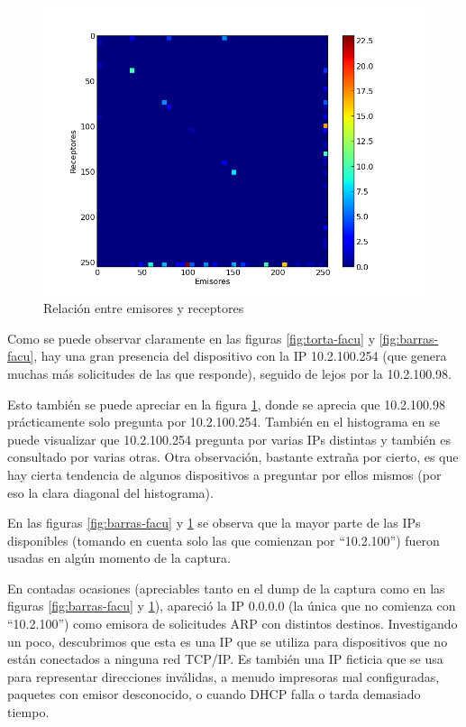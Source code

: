 \begin{figure}[!h]
  \includegraphics[width=\textwidth,keepaspectratio]{graph/hist2d-facu.png}
  \caption{Relación entre emisores y receptores}
  \label{fig:hist2d-facu}
\end{figure}

Como se puede observar claramente en las figuras \ref{fig:torta-facu} y 
\ref{fig:barras-facu}, hay una gran presencia del dispositivo con la IP
10.2.100.254 (que genera muchas más solicitudes de las que responde),
seguido de lejos por la 10.2.100.98.

Esto también se puede apreciar en la figura \ref{fig:hist2d-facu}, donde se
aprecia que 10.2.100.98 prácticamente solo pregunta por 10.2.100.254.
También en el histograma en se puede visualizar que 10.2.100.254 pregunta por
varias IPs distintas y también es consultado por varias otras. Otra observación,
bastante extraña por cierto, es que hay cierta tendencia de algunos dispositivos
a preguntar por ellos mismos (por eso la clara diagonal del histograma).

En las figuras \ref{fig:barras-facu} y \ref{fig:hist2d-facu} se observa
que la mayor parte de las IPs disponibles (tomando en cuenta solo las que
comienzan por ``10.2.100'') fueron usadas en algún momento de la captura.

En contadas ocasiones (apreciables tanto en el dump de la captura
como en las figuras \ref{fig:barras-facu} y \ref{fig:hist2d-facu}), apareció la
IP 0.0.0.0 (la única que no comienza con ``10.2.100'') como emisora de
solicitudes ARP con distintos destinos. Investigando un poco, descubrimos que
esta es una IP que se utiliza para dispositivos que no están conectados a
ninguna red TCP/IP. Es también una IP ficticia que se usa para representar
direcciones inválidas, a menudo impresoras mal configuradas, paquetes con emisor
desconocido, o cuando DHCP falla o tarda demasiado tiempo.

